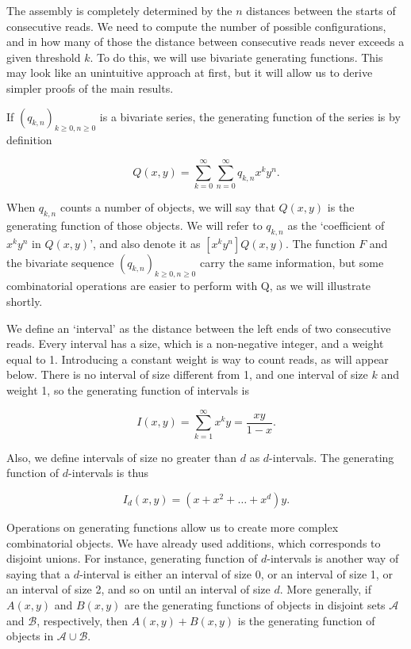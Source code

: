 \documentclass{article}
\begin{document}
The assembly is completely determined by the $n$ distances between the
starts of consecutive reads. We need to compute the number of possible
configurations, and in how many of those the distance between consecutive
reads never exceeds a given threshold $k$. To do this, we will use
bivariate generating functions. This may look like an unintuitive approach
at first, but it will allow us to derive simpler proofs of the main
results.

If $(q_{k,n})_{k \geq 0, n \geq 0}$ is a bivariate series, the generating
function of the series is by definition

\begin{equation}
Q(x,y) = \sum_{k=0}^\infty \sum_{n=0}^\infty q_{k,n}x^ky^n.
\end{equation}

When $q_{k,n}$ counts a number of objects, we will say that $Q(x,y)$ is
the generating function of those objects. We will refer to $q_{k,n}$ as
the `coefficient of $x^ky^n$ in $Q(x,y)$', and also denote it as $[x^ky^n]
Q(x,y)$. The function $F$ and the bivariate sequence $(q_{k,n})_{k \geq 0,
n \geq 0}$ carry the same information, but some combinatorial operations
are easier to perform with Q, as we will illustrate shortly.

We define an `interval' as the distance between the left ends of two
consecutive reads. Every interval has a size, which is a non-negative
integer, and a weight equal to 1. Introducing a constant weight is way to
count reads, as will appear below. There is no interval of size different
from 1, and one interval of size $k$ and weight 1, so the generating
function of intervals is

\begin{equation*}
I(x,y) = \sum_{k=1}^\infty x^ky = \frac{xy}{1-x}.
\end{equation*}

Also, we define intervals of size no greater than $d$ as $d$-intervals.
The generating function of $d$-intervals is thus

\begin{equation}
\label{eq:dintervals}
I_d(x,y) = (x+x^2+\ldots+x^d)y.
\end{equation}

Operations on generating functions allow us to create more complex
combinatorial objects. We have already used additions, which corresponds
to disjoint unions. For instance, generating function of $d$-intervals is
another way of saying that a $d$-interval is either an interval of size 0,
or an interval of size 1, or an interval of size 2, and so on until an
interval of size $d$. More generally, if $A(x,y)$ and $B(x,y)$ are the
generating functions of objects in disjoint sets $\mathcal{A}$ and
$\mathcal{B}$, respectively, then $A(x,y)+B(x,y)$ is the generating
function of objects in $\mathcal{A} \cup \mathcal{B}$.
\end{document}
